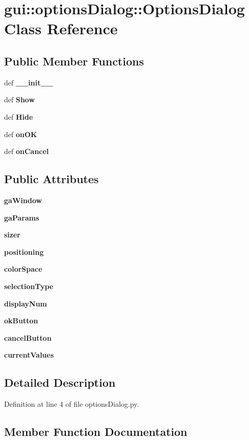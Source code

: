 \section{gui::optionsDialog::OptionsDialog Class Reference}
\label{classgui_1_1optionsDialog_1_1OptionsDialog}
\subsection*{Public Member Functions}
\begin{CompactItemize}
\item 
def {\bf \_\-\_\-init\_\-\_\-}
\item 
def {\bf Show}
\item 
def {\bf Hide}
\item 
def {\bf onOK}
\item 
def {\bf onCancel}
\end{CompactItemize}
\subsection*{Public Attributes}
\begin{CompactItemize}
\item 
{\bf gaWindow}
\item 
{\bf gaParams}
\item 
{\bf sizer}
\item 
{\bf positioning}
\item 
{\bf colorSpace}
\item 
{\bf selectionType}
\item 
{\bf displayNum}
\item 
{\bf okButton}
\item 
{\bf cancelButton}
\item 
{\bf currentValues}
\end{CompactItemize}


\subsection{Detailed Description}


Definition at line 4 of file optionsDialog.py.

\subsection{Member Function Documentation}
